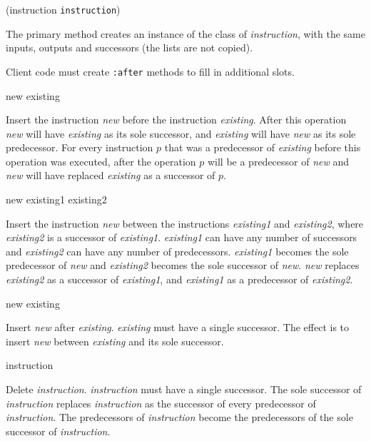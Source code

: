  {(instruction {\tt instruction})}

The primary method creates an instance of the class of
\textit{instruction}, with the same inputs, outputs and successors
(the lists are not copied). 

Client code must create \texttt{:after} methods to fill in additional
slots. 

 {new existing}

Insert the instruction \textit{new} before the instruction
\textit{existing}.  After this operation \textit{new} will have
\textit{existing} as its sole successor, and \textit{existing} will
have \textit{new} as its sole predecessor.  For every instruction $p$
that was a predecessor of \textit{existing} before this operation was
executed, after the operation $p$ will be a predecessor of
\textit{new} and \textit{new} will have replaced \textit{existing} as
a successor of $p$.

 {new existing1 existing2}

Insert the instruction \textit{new} between the instructions
\textit{existing1} and \textit{existing2}, where \textit{existing2} is
a successor of \textit{existing1}.  \textit{existing1} can have any
number of successors and \textit{existing2} can have any number of
predecessors.  \textit{existing1} becomes the sole predecessor of
\textit{new} and \textit{existing2} becomes the sole successor of
\textit{new}.  \textit{new} replaces \textit{existing2} as a successor
of \textit{existing1}, and \textit{existing1} as a predecessor of
\textit{existing2}.

 {new existing}

Insert \textit{new} after \textit{existing}.  \textit{existing} must
have a single successor.  The effect is to insert \textit{new} between
\textit{existing} and its sole successor.

 {instruction}

Delete \textit{instruction}.  \textit{instruction} must have a single
successor.  The sole successor of \textit{instruction} replaces
\textit{instruction} as the successor of every predecessor of
\textit{instruction}.  The predecessors of \textit{instruction} become
the predecessors of the sole successor of \textit{instruction}.

